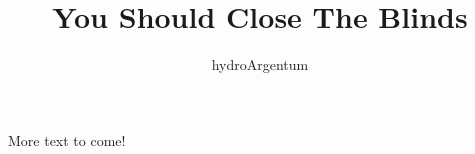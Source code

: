 \documentclass[letterpaper]{article}
\title{\textbf{Y}ou \textbf{S}hould \textbf{C}lose \textbf{T}he \textbf{B}linds}
\author{hydroArgentum}
\begin{document}
	\maketitle
	\newpage

	More text to come!
\end{document}
